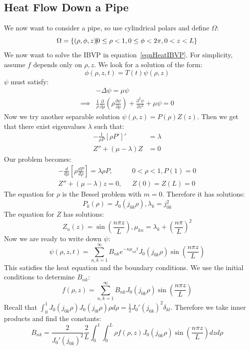 \documentclass[../Main.tex]{subfiles}
\begin{document}
\subsection{Heat Flow Down a Pipe}
We now want to consider a pipe, so use cylindrical polars and define $\Omega$:
\begin{equation*}
    \Omega = \{(\rho, \phi, z) \vline 0 \leq \rho < 1, 0 \leq \phi < 2\pi, 0 < z < L\}
\end{equation*}
We now want to solve the IBVP in equation~\ref{eqnHeatIBVP}. For simplicity, assume $f$ depends only on $\rho, z$. We look for a solution of the form:
\begin{equation*}
    \phi(\rho, z, t) = T(t) \psi(\rho, z)
\end{equation*}
$\psi$ must satisfy:
\begin{align*}
    &-\Delta \psi = \mu \psi \\
    \implies &\frac{1}{\rho} \frac{\partial}{\partial \rho} \left(\rho \frac{\partial \psi}{\partial \rho}\right) + \frac{\partial^{2}\psi}{\partial z^{2}} + \mu \psi = 0
\end{align*}
Now we try another separable solution $\psi(\rho, z) = P(\rho) Z(z)$. Then we get that there exist eigenvalues $\lambda$ such that:
\begin{align*}
    -\frac{1}{\rho P} [\rho P']' &= \lambda \\
    Z'' + (\mu - \lambda) Z &= 0
\end{align*}
Our problem becomes:
\begin{align*}
    -\frac{d}{d\rho}\left[\rho \frac{dP}{d\rho}\right] = \lambda \rho P,~~&~0 < \rho < 1, P(1) = 0 \\
    Z'' + (\mu - \lambda) z = 0,~~&~Z(0) = Z(L) = 0
\end{align*}
The equation for $\rho$ is the Bessel problem with $m = 0$. Therefore it has solutions:
\begin{equation*}
    P_k(\rho) = J_0(j_{0k}\rho), \lambda_k = j_{0k}^2
\end{equation*}
The equation for $Z$ has solutions:
\begin{equation*}
    Z_n(z) = \sin\left(\frac{n \pi z}{L}\right), \mu_{kn} = \lambda_k +\left(\frac{n \pi}{L}\right)^2
\end{equation*}
Now we are ready to write down $\psi$:
\begin{equation*}
    \psi(\rho, z, t) = \sum_{n, k = 1}^{\infty} B_{nk} e^{-\kappa \mu_{nk} t} J_0(j_{0k}\rho) \sin\left(\frac{n \pi z}{L}\right)
\end{equation*}
This satisfies the heat equation and the boundary conditions. We use the initial conditions to determine $B_{nk}$:
\begin{equation*}
    f(\rho, z) = \sum_{n, k = 1}^{\infty} B_{nk} J_0(j_{0k} \rho) \sin\left(\frac{n \pi z}{L}\right)
\end{equation*}
Recall that $\int_{0}^{1} J_{0}(j_{0k} \rho) J_{0} (j_{0l} \rho) \rho d\rho = \frac12 J_0'(j_{0k})^2 \delta_{kl}$. Therefore we take inner products and find the constants:
\begin{equation*}
    B_{nk} = \frac{2}{J_0'(j_{0k})^2} \frac{2}{L} \int_{0}^{1} \int_{0}^{L} \rho f(\rho, z) J_0(j_{0k}\rho) \sin\left(\frac{n \pi z}{L}\right) dz  d\rho 
\end{equation*}
\end{document}
